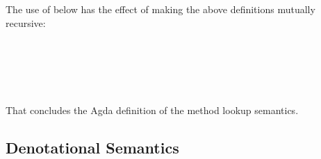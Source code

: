 \begin{AgdaAlign}
The use of  below has the effect of making the above definitions mutually recursive:
%
\begin{code}%
%
\>[4]\AgdaSpace{}%
\AgdaSymbol{:}\AgdaSpace{}%
\AgdaSpace{}%
\AgdaSpace{}%
\AgdaSpace{}%
\AgdaSpace{}%
\AgdaSpace{}%
\AgdaSpace{}%
\<%
\\
%
\>[4]\AgdaSpace{}%
\AgdaSymbol{=}\AgdaSpace{}%
\AgdaSpace{}%
\AgdaSpace{}%
\AgdaSpace{}%
\AgdaSpace{}%
\<%
\\
%
\>[4]%
\>[13]\AgdaSymbol{=}\AgdaSpace{}%
\AgdaSpace{}%
\AgdaSymbol{(}\AgdaSpace{}%
\AgdaSymbol{(}\AgdaSpace{}%
\AgdaSymbol{))}\<%
\\
%
\>[4]%
\>[13]\AgdaSymbol{=}\AgdaSpace{}%
\AgdaSpace{}%
\AgdaSymbol{(}\AgdaSpace{}%
\AgdaSymbol{(}\AgdaSpace{}%
\AgdaSymbol{(}\AgdaSpace{}%
\AgdaSymbol{)))}\<%
\\
%
\>[4]%
\>[13]\AgdaSymbol{=}\AgdaSpace{}%
\AgdaSpace{}%
\AgdaSymbol{(}\AgdaSpace{}%
\AgdaSymbol{(}\AgdaSpace{}%
\AgdaSymbol{(}\AgdaSpace{}%
\AgdaSymbol{)))}\<%
\end{code}
%
That concludes the Agda definition of the method lookup semantics.

\subsection{Denotational Semantics}


\end{AgdaAlign}
